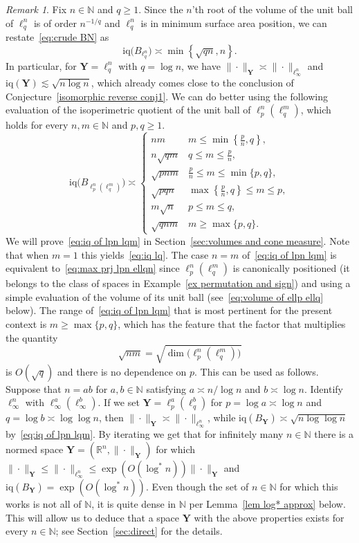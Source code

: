 \documentclass[11pt,reqno]{amsart}
\renewcommand{\le}{\leqslant}
\renewcommand{\ge}{\geqslant}
\newcommand{\Y}{\mathbf Y}
\newcommand{\R}{\mathbb R}
\theoremstyle{remark}
\newtheorem{remark}[theorem]{Remark}
\newcommand{\iq}{\mathrm{iq}}
\newcommand{\N}{\mathbb N}
\renewcommand{\1}{\mathbf 1}
\begin{document}
\begin{remark}\label{rem:nested lp}
Fix $n\in \N$ and $q\ge 1$. Since the $n$'th root of the volume of the unit ball of $\ell_q^n$ is of order $n^{-1/q}$ and $\ell_q^n$ is in minimum surface area position, we can restate~\eqref{eq:crude BN} as
\begin{equation}\label{eq:iq lq}
\iq\big(B_{\ell_q^n}\big)\asymp \min\left\{\sqrt{qn},n\right\}.
\end{equation}
In particular, for $\Y=\ell_q^n$ with $q=\log n$, we have  $\|\cdot\|_{\Y}\asymp \|\cdot\|_{\ell_\infty^n}$ and  $\iq(\Y)\lesssim \sqrt{n\log n}$, which already comes  close to the conclusion of  Conjecture~\ref{isomorphic reverse conj1}. We can do better using the following evaluation of the isoperimetric quotient of the unit ball of $\ell_p^n(\ell_q^m)$, which holds for every $n,m\in \N$ and $p,q\ge 1$.
\begin{equation}\label{eq:iq of lpn lqm}
\iq\big(B_{\ell_p^n(\ell_q^m)}\big)\asymp
\left\{\begin{array}{ll}nm& m\le \min\left\{\frac{p}{n},q\right\},\\ n\sqrt{qm}  & q\le m\le \frac{p}{n},\\ \sqrt{pnm}&\frac{p}{n}\le m\le \min\{p,q\},\\\sqrt{pqn}
& \max\left\{\frac{p}{n},q\right\}\le m\le p,\\
m\sqrt{n}& p\le m\le q,\\
\sqrt{qnm}  & m\ge\max\{p,q\}.\end{array} \right.
\end{equation}
We will prove~\eqref{eq:iq of lpn lqm} in Section~\ref{sec:volumes and cone measure}. Note that when $m=1$ this yields~\eqref{eq:iq lq}. The case  $n=m$ of~\eqref{eq:iq of lpn lqm} is equivalent to~\eqref{eq:max prj lpn ellqn} since $\ell_p^n(\ell_q^m)$ is canonically positioned (it belongs to the class of spaces in Example~\ref{ex permutation and sign}) and using a simple evaluation of the volume of its unit ball (see~\eqref{eq:volume of ellp ellq} below). The range of~\eqref{eq:iq of lpn lqm} that is most pertinent for the present context is  $m\ge \max\{p,q\}$, which has the feature that the factor that multiplies the quantity
$$\sqrt{nm}=\sqrt{\dim\big(\ell_p^n(\ell_q^m)\big)}$$
is $O(\sqrt{q})$ and there is no dependence on $p$. This can be used as follows. Suppose that $n=ab$ for $a,b\in \N$ satisfying  $a\asymp n/\log n$ and $b\asymp \log n$. Identify  $\ell_\infty^n$ with $\ell_\infty^{a}(\ell_\infty^{b})$. If we  set $\Y=\ell_p^a(\ell_q^b)$ for $p=\log a\asymp \log n$ and $q=\log b\asymp \log\log n$, then $\|\cdot\|_\Y\asymp \|\cdot\|_{\ell_\infty^n}$, while $\iq(B_\Y)\asymp \sqrt{n\log\log n}$ by~\eqref{eq:iq of lpn lqm}. By iterating  we get that  for infinitely many $n\in \N$ there is a normed space $\Y=(\R^n,\|\cdot\|_\Y)$ for which $\|\cdot\|_\Y\le \|\cdot\|_{\ell_\infty^n}\le \exp(O(\log^*\!\! n))\|\cdot\|_\Y$ and $\iq(B_\Y)=\exp(O(\log^*\!\! n))$. Even though the set of $n\in \N$ for which this works is not all of $\N$, it is quite dense in $\N$ per Lemma~\ref{lem log* approx} below.  This will allow us to deduce that a space $\Y$ with the above properties exists for every $n\in \N$; see Section~\ref{sec:direct} for the details.
\end{remark}
\end{document}
